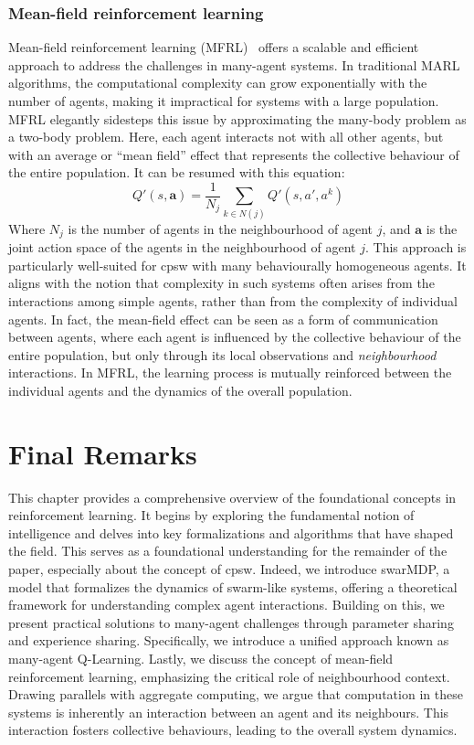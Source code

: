 \subsubsection*{Mean-field reinforcement learning}
Mean-field reinforcement learning (MFRL)~\cite{pmlr-v80-yang18d} offers a scalable and efficient approach to address the challenges in many-agent systems. 
 In traditional MARL algorithms, 
 the computational complexity can grow exponentially with the number of agents, 
 making it impractical for systems with a large population. 
 MFRL elegantly sidesteps this issue by approximating the many-body problem as a two-body problem. 
 Here, each agent interacts not with all other agents, 
 but with an average or ``mean field'' effect that represents the collective behaviour of the entire population.
 It can be resumed with this equation:
 $$
 Q'(s, \bm{a}) = \frac{1}{N_j} \sum_{k \in N(j)} Q'(s, a', a^k)
 $$
Where $N_j$ is the number of agents in the neighbourhood of agent $j$, and $\bm{a}$ is the joint action space of the agents in the neighbourhood of agent $j$.
%
This approach is particularly well-suited for \ac{cpsw} with many behaviourally homogeneous agents. 
 It aligns with the notion that complexity in such systems often arises from the interactions among simple agents,
 rather than from the complexity of individual agents.
 In fact, the mean-field effect can be seen as a form of communication between agents, 
 where each agent is influenced by the collective behaviour of the entire population, but only through its local observations and \emph{neighbourhood} interactions. 
 In MFRL, the learning process is mutually reinforced between the individual agents and the dynamics of the overall population. 
%

\section{Final Remarks}
This chapter provides a comprehensive overview of the foundational concepts in reinforcement learning. 
 It begins by exploring the fundamental notion of intelligence and delves into key formalizations and algorithms that have shaped the field. 
 This serves as a foundational understanding for the remainder of the paper, 
 especially about the concept of \ac{cpsw}.
Indeed, we introduce swarMDP, 
 a model that formalizes the dynamics of swarm-like systems, 
 offering a theoretical framework for understanding complex agent interactions. 
 Building on this, we present practical solutions to many-agent challenges 
 through parameter sharing and experience sharing. 
 Specifically, we introduce a unified approach known as many-agent Q-Learning.
%
Lastly, we discuss the concept of mean-field reinforcement learning, 
 emphasizing the critical role of neighbourhood context. 
 Drawing parallels with aggregate computing, 
 we argue that computation in these systems is inherently an interaction between an agent and its neighbours. 
 This interaction fosters collective behaviours, leading to the overall system dynamics.